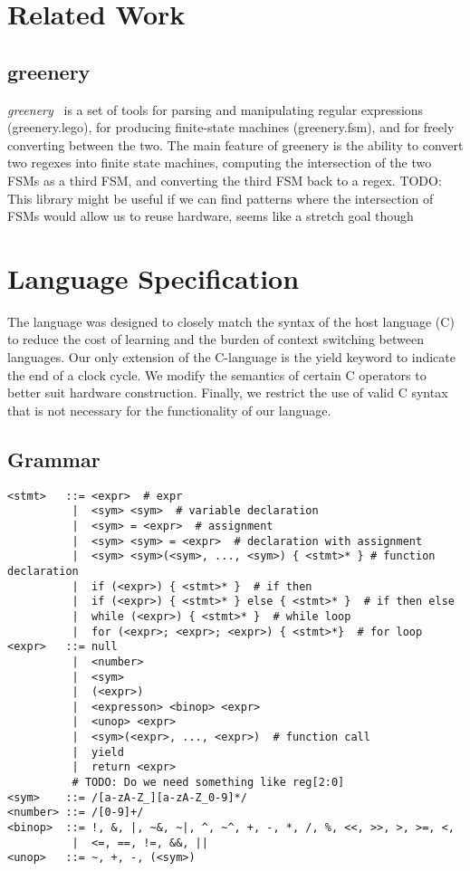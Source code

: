 \documentclass{article}
\newcommand{\TODO}[1]{}
\renewcommand{\TODO}[1]{{\color{red} TODO: {#1}}}
\begin{document}
\section{Related Work}

\subsection{greenery}
\emph{greenery}~\cite{greenery-github} is a set of tools for parsing
and manipulating regular expressions (greenery.lego), for producing
finite-state machines (greenery.fsm), and for freely converting between
the two.  The main feature of greenery is the ability to convert two
regexes into finite state machines, computing the intersection of the
two FSMs as a third FSM, and converting the third FSM back to a regex.
\TODO{This library might be useful if we can find patterns where the intersection of FSMs would allow us to reuse hardware, seems like a stretch goal though}

\section{Language Specification}
\label{sec:language_specification}
The language was designed to closely match the syntax of the host language (C)
to reduce the cost of learning and the burden of context switching between
languages.  Our only extension of the C-language is the yield keyword to
indicate the end of a clock cycle. We modify the semantics of certain C
operators to better suit hardware construction.  Finally, we restrict the use
of valid C syntax that is not necessary for the functionality of our language. 

\subsection{Grammar}
\begin{verbatim}
<stmt>   ::= <expr>  # expr
          |  <sym> <sym>  # variable declaration
          |  <sym> = <expr>  # assignment
          |  <sym> <sym> = <expr>  # declaration with assignment
          |  <sym> <sym>(<sym>, ..., <sym>) { <stmt>* } # function declaration
          |  if (<expr>) { <stmt>* }  # if then
          |  if (<expr>) { <stmt>* } else { <stmt>* }  # if then else
          |  while (<expr>) { <stmt>* }  # while loop
          |  for (<expr>; <expr>; <expr>) { <stmt>*}  # for loop
<expr>   ::= null
          |  <number>
          |  <sym>
          |  (<expr>)
          |  <expresson> <binop> <expr>
          |  <unop> <expr>
          |  <sym>(<expr>, ..., <expr>)  # function call
          |  yield
          |  return <expr>
          # TODO: Do we need something like reg[2:0]
<sym>    ::= /[a-zA-Z_][a-zA-Z_0-9]*/
<number> ::= /[0-9]+/
<binop>  ::= !, &, |, ~&, ~|, ^, ~^, +, -, *, /, %, <<, >>, >, >=, <,
          |  <=, ==, !=, &&, ||
<unop>   ::= ~, +, -, (<sym>)
\end{verbatim}
\end{document}
